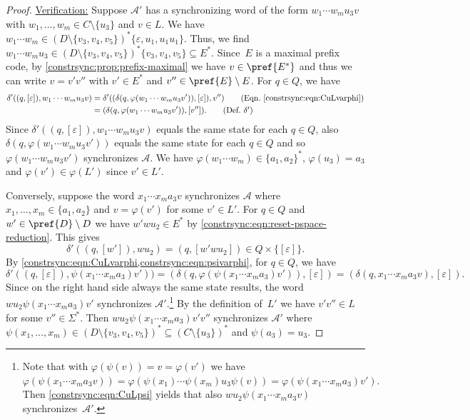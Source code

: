 \begin{proof}
	\medskip
	\noindent\underline{Verification:} Suppose $\mathcal A'$ has a synchronizing word
	of the form $w_1 \cdots w_m u_3 v$
	with $w_1, \ldots, w_m \in C \setminus\{u_3\}$
	and $v \in L$.
	We have $w_1 \cdots w_m \in (D \setminus \{ v_3, v_4, v_5 \})^* \{ \varepsilon, u_1, u_1 u_1\}$.
	Thus, we find
	$w_1 \cdots w_m u_3 \in (D \setminus \{ v_3, v_4, v_5 \})^* \{ v_3, v_4, v_5 \} \subseteq E^*$.
	Since~$E$ is a maximal prefix code,
	by \cref{constrsync:prop:prefix-maximal} 
	we have $v \in \pref{E^*}$
	and thus we can write $v = v' v''$ with $v' \in E^*$ and $v'' \in \pref{E} \setminus E$.
	For $q \in Q$,
	we have 
	\begin{align*}
		\delta'((q, [\varepsilon]), w_1 \cdots w_m u_3 v)
		& = \delta'( (\delta(q, \varphi( w_1 \cdots w_m u_3 v' )), [\varepsilon]), v'') \tag{Eqn.~\eqref{constrsync:eqn:CuLvarphi}} \\
		& = (\delta(q, \varphi( w_1 \cdots w_m u_3 v' )), [v'']). \tag{Def.~$\delta'$}
	\end{align*}
	Since $\delta'((q, [\varepsilon]), w_1 \cdots w_m u_3 v)$
	equals the same state for each $q \in Q$,
	also $\delta(q, \varphi( w_1 \cdots w_m u_3 v' ))$
	equals the same state for each $q \in Q$
	and so $\varphi( w_1 \cdots w_m u_3 v' )$
	synchronizes $\mathcal A$.
	We have $\varphi(w_1 \cdots w_m) \in\{a_1, a_2\}^*$,
	$\varphi(u_3) = a_3$
	and $\varphi(v') \in \varphi(L')$
	since $v' \in L'$.	
		
	Conversely, suppose the word $x_1 \cdots x_m a_3 v$ synchronizes $\mathcal A$
	where $x_1, \ldots, x_m \in \{a_1, a_2\}$
	and $v = \varphi(v')$ for some $v' \in L'$.
	For $q \in Q$ and $w' \in \pref{D} \setminus D$
	we have $w'wu_2 \in E^*$ by \cref{constrsync:eqn:reset-pspace-reduction}.
	This gives
	\[
	\delta'((q, [w']), w u_2)
	= (q, [w'wu_2]) \in Q \times \{ [\varepsilon] \}.
	\]	
	By \cref{constrsync:eqn:CuLvarphi,constrsync:eqn:psivarphi}, for $q \in Q$, we
	have
	\[
	\delta'((q, [\varepsilon]), \psi(x_1 \cdots x_m a_3)v'))
	= (\delta(q, \varphi( \psi(x_1 \cdots x_m a_3)v' ) ), [\varepsilon])
	= (\delta(q, x_1 \cdots x_m a_3 v), [\varepsilon]).
	\]
	Since on the right hand side always the same state
	results, the word $wu_2 \psi(x_1 \cdots x_m a_3)v'$
	synchronizes $\mathcal A'$.\footnote{Note that
		with $\varphi(\psi(v)) = v = \varphi(v')$ we have  
	$
	\varphi(\psi(x_1 \cdots x_m a_3 v))
	= \varphi(\psi(x_1)\cdots \psi(x_m) u_3 \psi(v))
	= \varphi(\psi(x_1 \cdots x_m a_3)v').
	$	
	Then \cref{constrsync:eqn:CuLpsi}
	yields that also $wu_2\psi(x_1 \cdots x_m a_3 v)$ 
	synchronizes~$\mathcal A'$.
	}	
	By the definition of~$L'$
	we have $v' v'' \in L$ for some $v'' \in \Sigma^*$.
	Then $wu_2 \psi(x_1 \cdots x_m a_3) v' v''$
	synchronizes $\mathcal A'$
	where $\psi(x_1, \ldots, x_m) \in ( D \setminus \{ v_3, v_4, v_5 \} )^* \subseteq ( C \setminus \{u_3\} )^*$
	and $\psi(a_3) = u_3$.	
\end{proof}

